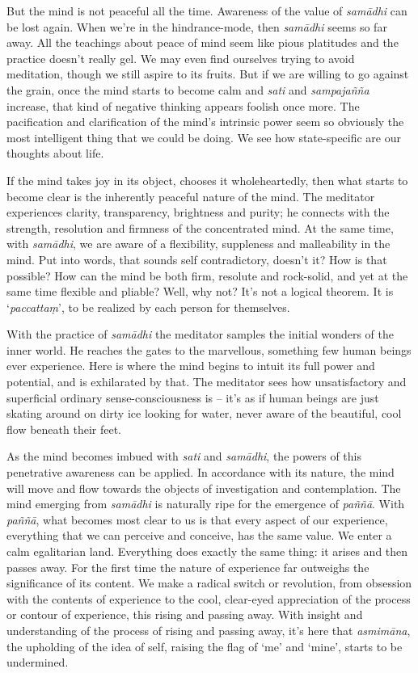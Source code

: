 But the mind is not peaceful all the time. Awareness of the value of
\emph{samādhi} can be lost again. When we're in the hindrance-mode, then
\emph{samādhi} seems so far away. All the teachings about peace of mind
seem like pious platitudes and the practice doesn't really gel. We may
even find ourselves trying to avoid meditation, though we still aspire
to its fruits. But if we are willing to go against the grain, once the
mind starts to become calm and \emph{sati} and \emph{sampajañña}
increase, that kind of negative thinking appears foolish once more. The
pacification and clarification of the mind's intrinsic power seem so
obviously the most intelligent thing that we could be doing. We see how
state-specific are our thoughts about life. 

If the mind takes joy in its object, chooses it wholeheartedly, then
what starts to become clear is the inherently peaceful nature of the
mind. The meditator experiences clarity, transparency, brightness and
purity; he connects with the strength, resolution and firmness of the
concentrated mind. At the same time, with \emph{samādhi}, we are aware
of a flexibility, suppleness and malleability in the mind. Put into
words, that sounds self contradictory, doesn't it? How is that possible? 
How can the mind be both firm, resolute and rock-solid, and yet at the
same time flexible and pliable? Well, why not? It's not a logical
theorem. It is `\emph{paccattaṃ}', to be realized by each person for
themselves. 

With the practice of \emph{samādhi} the meditator samples the initial
wonders of the inner world. He reaches the gates to the marvellous, 
something few human beings ever experience. Here is where the mind
begins to intuit its full power and potential, and is exhilarated by
that. The meditator sees how unsatisfactory and superficial ordinary
sense-consciousness is -- it's as if human beings are just skating
around on dirty ice looking for water, never aware of the beautiful, 
cool flow beneath their feet. 

As the mind becomes imbued with \emph{sati} and \emph{samādhi}, the
powers of this penetrative awareness can be applied. In accordance with
its nature, the mind will move and flow towards the objects of
investigation and contemplation. The mind emerging from \emph{samādhi}
is naturally ripe for the emergence of \emph{paññā}. With \emph{paññā}, 
what becomes most clear to us is that every aspect of our experience, 
everything that we can perceive and conceive, has the same value. We
enter a calm egalitarian land. Everything does exactly the same thing: 
it arises and then passes away. For the first time the nature of
experience far outweighs the significance of its content. We make a
radical switch or revolution, from obsession with the contents of
experience to the cool, clear-eyed appreciation of the process or
contour of experience, this rising and passing away. With insight and
understanding of the process of rising and passing away, it's here that
\emph{asmimāna}, the upholding of the idea of self, raising the flag of
`me' and `mine', starts to be undermined. 

